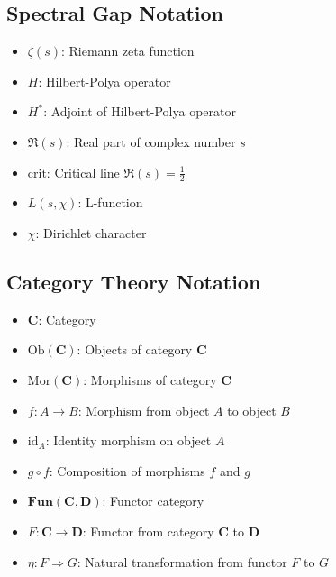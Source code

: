 \subsection{Spectral Gap Notation}
\begin{itemize}
\item $\zeta(s)$: Riemann zeta function
\item $H$: Hilbert-Polya operator
\item $H^*$: Adjoint of Hilbert-Polya operator
\item $\Re(s)$: Real part of complex number $s$
\item $\text{crit}$: Critical line $\Re(s) = \frac{1}{2}$
\item $L(s, \chi)$: L-function
\item $\chi$: Dirichlet character
\end{itemize}

\subsection{Category Theory Notation}
\begin{itemize}
\item $\mathbf{C}$: Category
\item $\text{Ob}(\mathbf{C})$: Objects of category $\mathbf{C}$
\item $\text{Mor}(\mathbf{C})$: Morphisms of category $\mathbf{C}$
\item $f: A \to B$: Morphism from object $A$ to object $B$
\item $\text{id}_A$: Identity morphism on object $A$
\item $g \circ f$: Composition of morphisms $f$ and $g$
\item $\mathbf{Fun}(\mathbf{C}, \mathbf{D})$: Functor category
\item $F: \mathbf{C} \to \mathbf{D}$: Functor from category $\mathbf{C}$ to $\mathbf{D}$
\item $\eta: F \Rightarrow G$: Natural transformation from functor $F$ to $G$
\end{itemize}

